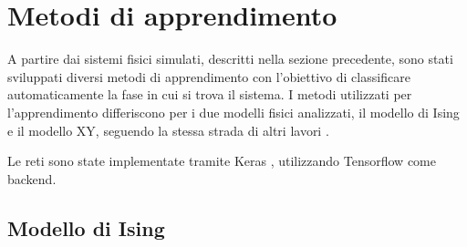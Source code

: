 \documentclass{article}
\begin{document}

\section{Metodi di apprendimento}
A partire dai sistemi fisici simulati, descritti nella sezione precedente, sono stati sviluppati diversi metodi di apprendimento con l'obiettivo di classificare automaticamente la fase in cui si trova il sistema.
I metodi utilizzati per l'apprendimento differiscono per i due modelli fisici analizzati, il modello di Ising e il modello XY, seguendo la stessa strada di altri lavori \cite{wessel}.

Le reti sono state implementate tramite Keras \cite{keras}, utilizzando Tensorflow \cite{tensorflow} come backend.

\subsection{Modello di Ising}
\end{document}

